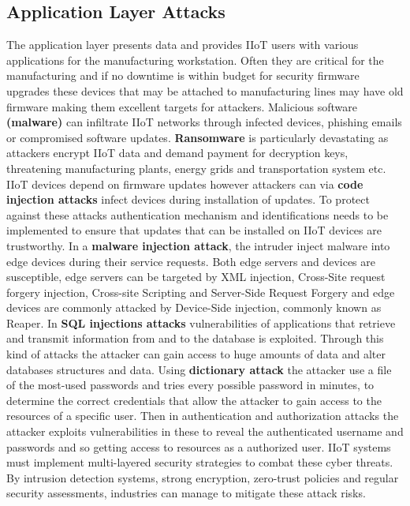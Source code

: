 \documentclass[article,a4paper]{IEEEtran}
\begin{document}
\subsection{Application Layer Attacks}
The application layer presents data and provides IIoT users with various applications for the manufacturing workstation. Often they are critical for the manufacturing and if no downtime is within budget for security firmware upgrades these devices that may be attached to manufacturing lines may have old firmware making them excellent targets for attackers.
\newline\newline   
Malicious software \textbf{(malware)} can infiltrate IIoT networks through infected devices, phishing emails or compromised software updates. \textbf{Ransomware} is particularly devastating as attackers encrypt IIoT data and demand payment for decryption keys, threatening manufacturing plants, energy grids and transportation system etc. 
\newline
IIoT devices depend on firmware updates however attackers can via \textbf{code injection attacks} infect devices during installation of updates. To protect against these attacks authentication mechanism and identifications needs to be implemented to ensure that updates that can be installed on IIoT devices are trustworthy. 
\newline
In a \textbf{malware injection attack}, the intruder inject malware into edge devices during their service requests. Both edge servers and devices are susceptible, edge servers can be targeted by XML injection, Cross-Site request forgery injection, Cross-site Scripting and Server-Side Request Forgery and edge devices are commonly attacked by Device-Side injection, commonly known as Reaper.
\newline 
In \textbf{SQL injections attacks} vulnerabilities of applications that retrieve and transmit information from and to the database is exploited. Through this kind of attacks the attacker can gain access to huge amounts of data and alter databases structures and data. 
\newline
Using \textbf{dictionary attack} the attacker use a file of the most-used passwords and tries every possible password in minutes, to determine the correct credentials that allow the attacker to gain access to the resources of a specific user. Then in authentication and authorization attacks the attacker exploits vulnerabilities in these to reveal the authenticated username and passwords and so getting access to resources as a authorized user.
\newline\newline
IIoT systems must implement multi-layered security strategies to combat these cyber threats. By intrusion detection systems, strong encryption, zero-trust policies and regular security assessments, industries can manage to mitigate these attack risks.
\end{document}
